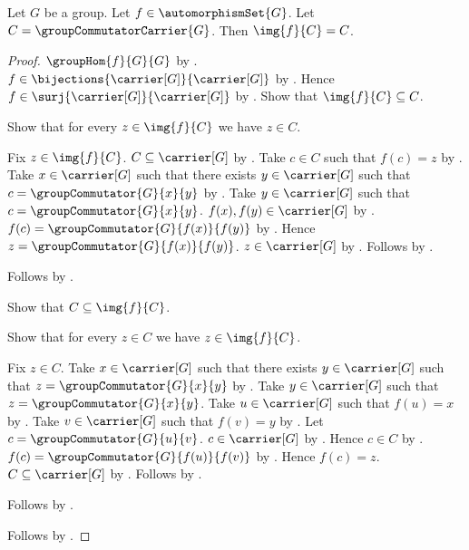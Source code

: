 \begin{theorem}\label{automorphism_image_commutator_generators}
    Let $G$ be a group.
    Let $f\in\automorphismSet{G}$.
    Let $C=\groupCommutatorCarrier{G}$.
    Then $\img{f}{C}=C$.
\end{theorem}
\begin{proof}
    $\groupHom{f}{G}{G}$ by .
    $f\in\bijections{\carrier[G]}{\carrier[G]}$ by
        .
    Hence $f\in\surj{\carrier[G]}{\carrier[G]}$ by
        .
    Show that $\img{f}{C}\subseteq C$.
    \begin{subproof}
        Show that for every $z\in\img{f}{C}$ we have $z\in C$.
        \begin{subproof}
            Fix $z\in\img{f}{C}$.
            $C\subseteq\carrier[G]$ by
                .
            Take $c\in C$ such that $f(c)=z$ by
                .
            Take $x\in\carrier[G]$ such that there exists
                $y\in\carrier[G]$ such that
                $c=\groupCommutator{G}{x}{y}$ by
                .
            Take $y\in\carrier[G]$ such that
                $c=\groupCommutator{G}{x}{y}$.
            $f(x),f(y)\in\carrier[G]$ by
                .
            $f(c)=\groupCommutator{G}{f(x)}{f(y)}$ by
                .
            Hence $z=\groupCommutator{G}{f(x)}{f(y)}$.
            $z\in\carrier[G]$ by
                .
            Follows by .
        \end{subproof}
        Follows by .
    \end{subproof}
    Show that $C\subseteq\img{f}{C}$.
    \begin{subproof}
        Show that for every $z\in C$ we have $z\in\img{f}{C}$.
        \begin{subproof}
            Fix $z\in C$.
            Take $x\in\carrier[G]$ such that there exists
                $y\in\carrier[G]$ such that
                $z=\groupCommutator{G}{x}{y}$ by
                .
            Take $y\in\carrier[G]$ such that
                $z=\groupCommutator{G}{x}{y}$.
            Take $u\in\carrier[G]$ such that $f(u)=x$ by
                .
            Take $v\in\carrier[G]$ such that $f(v)=y$ by
                .
            Let $c=\groupCommutator{G}{u}{v}$.
            $c\in\carrier[G]$ by .
            Hence $c\in C$ by
                .
            $f(c)=\groupCommutator{G}{f(u)}{f(v)}$ by
                .
            Hence $f(c)=z$.
            $C\subseteq\carrier[G]$ by
                .
            Follows by .
        \end{subproof}
        Follows by .
    \end{subproof}
    Follows by .
\end{proof}


